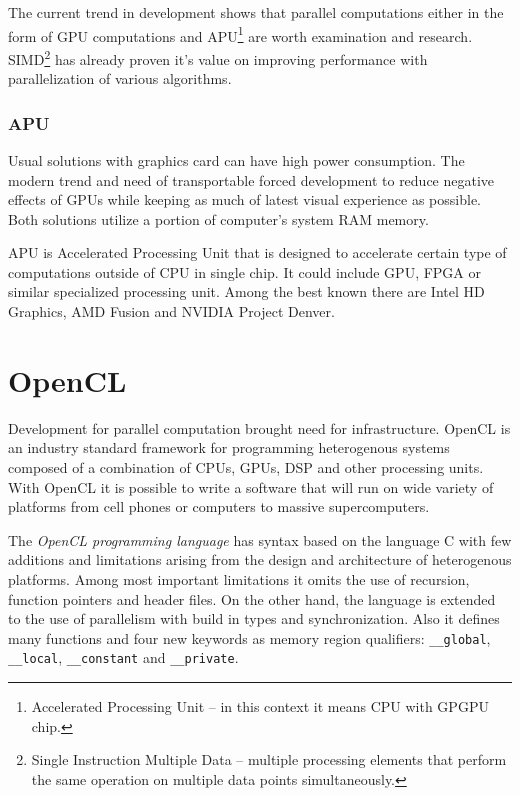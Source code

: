 The current trend in development shows that parallel computations either in the
form of GPU computations and APU\footnote{ Accelerated Processing Unit -- 
in this context it means CPU with GPGPU chip.} are
worth examination and research. SIMD\footnote{ Single Instruction Multiple Data 
-- multiple processing elements that perform the same operation on multiple data 
points simultaneously\cite{Flynn:1972}.} has already proven it's value on 
improving performance with parallelization of various 
algorithms\cite{nvidia:sample, amd:apps}.

%





\subsubsection*{APU}
Usual solutions with graphics card can have high power consumption. The modern
trend and need of transportable forced development to reduce negative 
effects of GPUs while keeping as much of latest visual experience as 
possible\cite{apu:efficiency}.
Both solutions utilize a portion of computer's system RAM memory.

APU is Accelerated Processing Unit that is designed to accelerate certain
type of computations outside of CPU in single chip. It could 
include GPU, FPGA or similar specialized processing unit. Among the best known 
there are Intel HD Graphics\cite{intel:apu}, AMD Fusion\cite{amd:apu} and NVIDIA 
Project Denver\cite{nvidia:apu}.

\section{OpenCL}
Development for parallel computation brought need for infrastructure. OpenCL
is an industry standard framework for programming heterogenous systems 
composed of a combination of CPUs, GPUs, DSP and other processing 
units\cite{opencl}. With OpenCL it is possible to write a software that will
run on wide variety of platforms from cell phones or computers to massive
supercomputers. 

The \textit{OpenCL programming language} has syntax based
on the language C with few additions and limitations arising from the design
and architecture of heterogenous platforms. Among most important limitations
it omits the use of recursion, function pointers and header files. On the 
other hand, the language is extended to the use of parallelism with build 
in types and synchronization. Also it defines many functions and four new
keywords as memory region qualifiers: \texttt{\_\_global}, 
\texttt{\_\_local}, \texttt{\_\_constant} and \texttt{\_\_private}.

